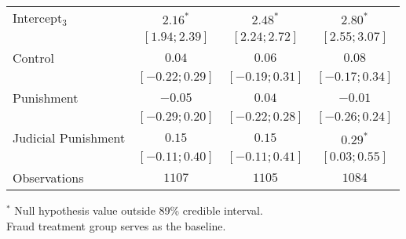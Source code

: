 \begin{table}[h]
\begin{center}
\begin{threeparttable}
\begin{tabular}{l c c c}
Intercept$_3$       & $2.16^{*}$        & $2.48^{*}$        & $2.80^{*}$        \\
                    & $ [ 1.94;  2.39]$ & $ [ 2.24;  2.72]$ & $ [ 2.55;  3.07]$ \\
Control             & $0.04$            & $0.06$            & $0.08$            \\
                    & $ [-0.22;  0.29]$ & $ [-0.19;  0.31]$ & $ [-0.17;  0.34]$ \\
Punishment          & $-0.05$           & $0.04$            & $-0.01$           \\
                    & $ [-0.29;  0.20]$ & $ [-0.22;  0.28]$ & $ [-0.26;  0.24]$ \\
Judicial Punishment & $0.15$            & $0.15$            & $0.29^{*}$        \\
                    & $ [-0.11;  0.40]$ & $ [-0.11;  0.41]$ & $ [ 0.03;  0.55]$ \\
\hline
Observations        & $1107$            & $1105$            & $1084$            \\
\hline
\end{tabular}
\begin{tablenotes}[flushleft]
\scriptsize{$^*$ Null hypothesis value outside 89\% credible interval.  \\
Fraud treatment group serves as the baseline.}
\end{tablenotes}
\end{threeparttable}
\label{table:coefficients}
\end{center}
\end{table}
